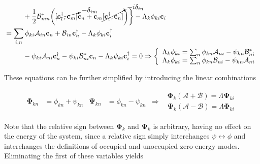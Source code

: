 \documentclass{homework}
\begin{document}
\begin{equation}
\begin{split}
    & \blanky \blanky \blanky \blanky \blanky \blanky \blanky \blanky + \frac{1}{2} \mathcal{B}_{mn}^{*} \bigg(\cancelto{-\delta_{im}}{[{\bf c}_i^\dagger, {\bf c}_m]} {\bf c}_n + {\bf c}_m \cancelto{-i\delta_{in}}{[{\bf c}_i^\dagger, {\bf c}_n]}\bigg) \bigg\} - \Lambda_k \phi_{ki} {\bf c}_i \\
    &= \sum_{i, n} \phi_{ki} \mathcal{A}_{i n} {\bf c}_n + \mathcal{B}_{i n} {\bf c}_n^\dagger - \Lambda_k \phi_{ki} {\bf c}_i^\dagger \\
    & \blanky \blanky \blanky \blanky \blanky \blanky \blanky \blanky - \psi_{ki} \mathcal{A}_{n i} {\bf c}_{n}^\dagger - \psi_{ki} \mathcal{B}_{n i}^{*} {\bf c}_n - \Lambda_k \psi_{ki} {\bf c}_i^\dagger = 0 \Rightarrow \left\{ \begin{array}{c}
         \Lambda_k \phi_{ki} = \sum_{n} \phi_{k n} \mathcal{A}_{n i} - \psi_{kn} \mathcal{B}_{n i}^{*} \\
         \Lambda_k \phi_{ki} = \sum_{n} \phi_{k n} \mathcal{B}_{n i} - \psi_{kn} \mathcal{A}_{n i}
    \end{array}\right. %
\end{split}
\end{equation}

These equations can be further simplified by introducing the linear combinations

\begin{align}
    \bm{\Phi}_{kn} &= \phi_{k n} + \psi_{kn} & \bm{\Psi}_{kn} &= \phi_{k n} - \psi_{kn} & \Rightarrow & \begin{array}{c}
         \bm{\Phi}_{k} (\bm{\mathcal{A}} + \bm{\mathcal{B}}) = \Lambda \bm{\Psi}_{ki} \\
         \bm{\Psi}_{k} (\bm{\mathcal{A}} - \bm{\mathcal{B}}) = \Lambda \bm{\Phi}_{ki}
    \end{array}
    \label{XY_coefficients}
\end{align}

Note that the relative sign between $\bm{\Phi}_{k}$
and $\bm{\Psi}_{k}$ is arbitrary, having no effect on the energy of the system, since a relative sign simply interchanges $\psi \leftrightarrow \phi$ and interchanges the definitions of occupied and unoccupied zero-energy modes. Eliminating the first of these variables yields 
\end{document}
